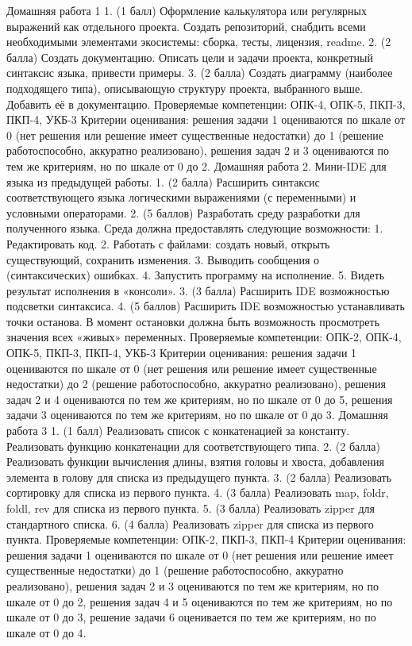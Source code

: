 Домашняя работа 1 
    1. (1 балл) Оформление калькулятора или регулярных выражений как отдельного проекта. Создать репозиторий, снабдить всеми необходимыми элементами экосистемы: сборка, тесты, лицензия, readme.
    2. (2 балла) Создать документацию. Описать цели и задачи проекта, конкретный синтаксис языка, привести примеры.
    3. (2 балла) Создать диаграмму (наиболее подходящего типа), описывающую структуру проекта, выбранного выше. Добавить её в документацию.
Проверяемые компетенции: ОПК-4, ОПК-5, ПКП-3, ПКП-4, УКБ-3
Критерии оценивания: решения задачи 1 оцениваются по шкале от 0 (нет решения или решение имеет существенные недостатки) до 1 (решение работоспособно, аккуратно реализовано), решения задач 2 и 3 оцениваются по тем же критериям, но по шкале от 0 до 2.
Домашняя работа 2. Мини-IDE для языка из предыдущей работы.
    1. (2 балла) Расширить синтаксис соответствующего языка логическими выражениями (с переменными) и условными операторами.
    2. (5 баллов) Разработать среду разработки для полученного языка. Среда должна предоставлять следующие возможности:
        1. Редактировать код.
        2. Работать с файлами: создать новый, открыть существующий, сохранить изменения. 
        3. Выводить сообщения о (синтаксических) ошибках.
        4. Запустить программу на исполнение.
        5. Видеть результат исполнения в «консоли».
    3. (3 балла) Расширить IDE возможностью подсветки синтаксиса.
    4. (5 баллов) Расширить IDE возможностью устанавливать точки останова. В момент остановки должна быть возможность просмотреть значения всех «живых» переменных.
Проверяемые компетенции: ОПК-2, ОПК-4, ОПК-5, ПКП-3, ПКП-4, УКБ-3
Критерии оценивания: решения задачи 1 оцениваются по шкале от 0 (нет решения или решение имеет существенные недостатки) до 2 (решение работоспособно, аккуратно реализовано), решения задач 2 и 4 оцениваются по тем же критериям, но по шкале от 0 до 5, решения задачи 3 оцениваются по тем же критериям, но по шкале от 0 до 3.
Домашняя работа 3 
    1. (1 балл) Реализовать список с конкатенацией за константу. Реализовать функцию конкатенации для соответствующего типа.
    2. (2 балла) Реализовать функции вычисления длины, взятия головы и хвоста, добавления элемента в голову для списка из предыдущего пункта.
    3. (2 балла) Реализовать сортировку для списка из первого пункта.
    4. (3 балла) Реализовать map, foldr, foldl, rev для списка из первого пункта.
    5. (3 балла) Реализовать zipper для стандартного списка.
    6. (4 балла) Реализовать zipper для списка из первого пункта.
Проверяемые компетенции: ОПК-2, ПКП-3, ПКП-4
Критерии оценивания: решения задачи 1 оцениваются по шкале от 0 (нет решения или решение имеет существенные недостатки) до 1 (решение работоспособно, аккуратно реализовано), решения задач 2 и 3 оцениваются по тем же критериям, но по шкале от 0 до 2, решения задач 4 и 5 оцениваются по тем же критериям, но по шкале от 0 до 3, решение задачи 6 оценивается по тем же критериям, но по шкале от 0 до 4.
  
